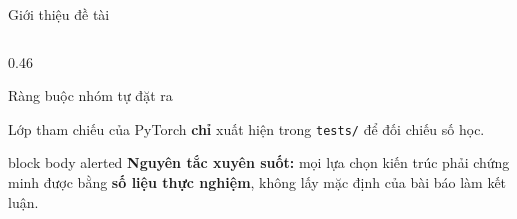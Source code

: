 \documentclass[aspectratio=169, 10pt]{beamer}
\begin{document}
\begin{frame}[shrink=10]{Giới thiệu đề tài}
\begin{columns}[T]
\begin{column}{0.46\textwidth}
\begin{block}{Ràng buộc nhóm tự đặt ra}
\begin{itemize}
        \end{itemize}
        Lớp tham chiếu của PyTorch \textbf{chỉ} xuất hiện trong \texttt{tests/} để
        đối chiếu số học.
      \end{block}
      \begin{beamercolorbox}[wd=\textwidth, rounded=true, sep=6pt]{block body alerted}
        {\color{MLIOTink}\footnotesize\textbf{Nguyên tắc xuyên suốt:} mọi lựa chọn
        kiến trúc phải chứng minh được bằng \textbf{số liệu thực nghiệm}, không lấy
        mặc định của bài báo làm kết luận.}
      \end{beamercolorbox}
    \end{column}
  \end{columns}
\end{frame}

\end{document}
